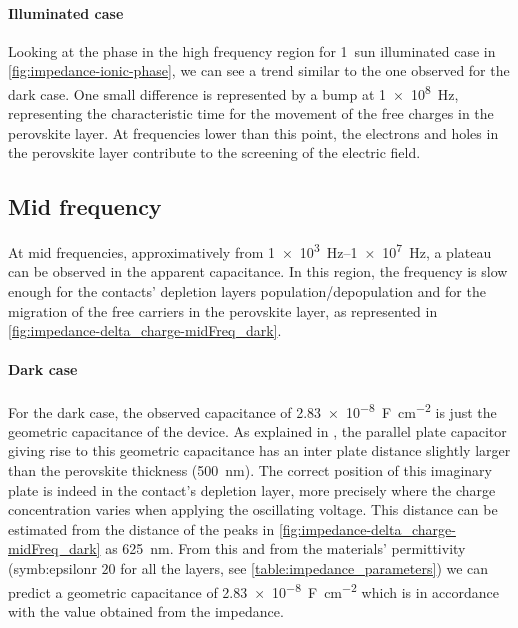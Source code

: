 		\paragraph{Illuminated case}
		Looking at the phase in the high frequency region for \SI{1}{sun} illuminated case in \cref{fig:impedance-ionic-phase}, we can see a trend similar to the one observed for the dark case.
		One small difference is represented by a bump at \SI{1e8}{\Hz}, representing the characteristic time for the movement of the free charges in the perovskite layer.
		At frequencies lower than this point, the electrons and holes in the perovskite layer contribute to the screening of the electric field.




	\subsection{Mid frequency}
		At mid frequencies, approximatively from \SIrange{1e3}{1e7}{\Hz}, a plateau can be observed in the apparent capacitance.
		In this region, the frequency is slow enough for the contacts' depletion layers population/depopulation and for the migration of the free carriers in the perovskite layer, as represented in \cref{fig:impedance-delta_charge-midFreq_dark}.

		\paragraph{Dark case}
		For the dark case, the observed capacitance of \SI{2.83e-8}{\farad\per\square\cm} is just the geometric capacitance of the device.
		As explained in , the parallel plate capacitor giving rise to this geometric capacitance has an inter plate distance slightly larger than the perovskite thickness (\SI{500}{\nm}).
		The correct position of this imaginary plate is indeed in the contact's depletion layer, more precisely where the charge concentration varies when applying the oscillating voltage.
		This distance can be estimated from the distance of the peaks in \cref{fig:impedance-delta_charge-midFreq_dark} as \SI{625}{\nm}.
		From this and from the materials' permittivity (\gls{symb:epsilonr} $20$ for all the layers, see \cref{table:impedance_parameters}) we can predict a geometric capacitance of \SI{2.83e-8}{\farad\per\square\cm} which is in accordance with the value obtained from the impedance.

